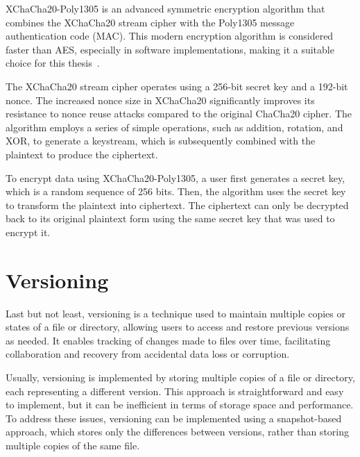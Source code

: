 XChaCha20-Poly1305 is an advanced symmetric encryption algorithm that combines the XChaCha20 stream cipher with the Poly1305 message authentication code (MAC).
This modern encryption algorithm is considered faster than AES, especially in software implementations, making it a suitable choice for this thesis~\cite{crypto_pp_xchacha20poly1305}.

The XChaCha20 stream cipher operates using a 256-bit secret key and a 192-bit nonce.
The increased nonce size in XChaCha20 significantly improves its resistance to nonce reuse attacks compared to the original ChaCha20 cipher.
The algorithm employs a series of simple operations, such as addition, rotation, and XOR, to generate a keystream, which is subsequently combined with the plaintext to produce the ciphertext.

To encrypt data using XChaCha20-Poly1305, a user first generates a secret key, which is a random sequence of 256 bits.
Then, the algorithm uses the secret key to transform the plaintext into ciphertext.
The ciphertext can only be decrypted back to its original plaintext form using the same secret key that was used to encrypt it.


\section{Versioning}\label{sec:versioning}

Last but not least, versioning is a technique used to maintain multiple copies or states of a file or directory, allowing users to access and restore previous versions as needed.
It enables tracking of changes made to files over time, facilitating collaboration and recovery from accidental data loss or corruption.

Usually, versioning is implemented by storing multiple copies of a file or directory, each representing a different version.
This approach is straightforward and easy to implement, but it can be inefficient in terms of storage space and performance.
To address these issues, versioning can be implemented using a snapshot-based approach, which stores only the differences between versions, rather than storing multiple copies of the same file.